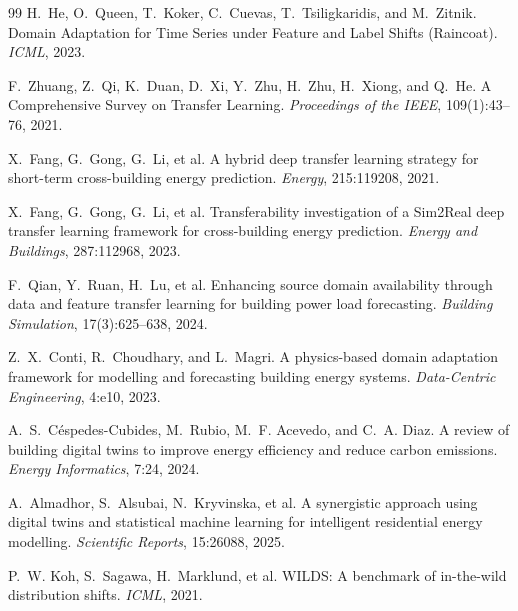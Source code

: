\documentclass{article}
\begin{document}
\small
\begin{thebibliography}{99}\setlength{\itemsep}{2pt}
H.~He, O.~Queen, T.~Koker, C.~Cuevas, T.~Tsiligkaridis, and M.~Zitnik.
Domain Adaptation for Time Series under Feature and Label Shifts (Raincoat).
\emph{ICML}, 2023.

F.~Zhuang, Z.~Qi, K.~Duan, D.~Xi, Y.~Zhu, H.~Zhu, H.~Xiong, and Q.~He.
A Comprehensive Survey on Transfer Learning.
\emph{Proceedings of the IEEE}, 109(1):43--76, 2021.

X.~Fang, G.~Gong, G.~Li, et al.
A hybrid deep transfer learning strategy for short-term cross-building energy prediction.
\emph{Energy}, 215:119208, 2021.

X.~Fang, G.~Gong, G.~Li, et al.
Transferability investigation of a Sim2Real deep transfer learning framework for cross-building energy prediction.
\emph{Energy and Buildings}, 287:112968, 2023.

F.~Qian, Y.~Ruan, H.~Lu, et al.
Enhancing source domain availability through data and feature transfer learning for building power load forecasting.
\emph{Building Simulation}, 17(3):625--638, 2024.

Z.~X.~Conti, R.~Choudhary, and L.~Magri.
A physics-based domain adaptation framework for modelling and forecasting building energy systems.
\emph{Data-Centric Engineering}, 4:e10, 2023.

A.~S.~Céspedes-Cubides, M.~Rubio, M.~F. Acevedo, and C.~A. Diaz.
A review of building digital twins to improve energy efficiency and reduce carbon emissions.
\emph{Energy Informatics}, 7:24, 2024.

A.~Almadhor, S.~Alsubai, N.~Kryvinska, et al.
A synergistic approach using digital twins and statistical machine learning for intelligent residential energy modelling.
\emph{Scientific Reports}, 15:26088, 2025.

P.~W. Koh, S.~Sagawa, H.~Marklund, et al.
WILDS: A benchmark of in-the-wild distribution shifts.
\emph{ICML}, 2021.
\end{thebibliography}
\end{document}
